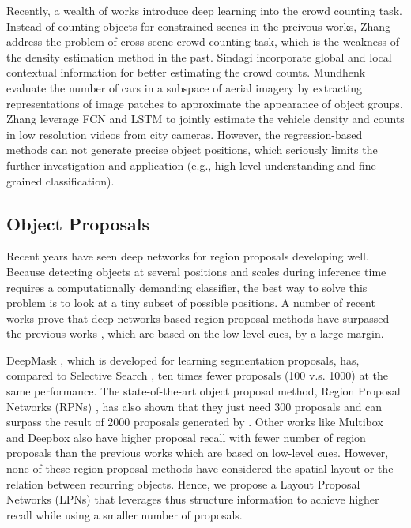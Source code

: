 \documentclass[10pt,twocolumn,letterpaper]{article}
\begin{document}
Recently, a wealth of works introduce deep learning into the crowd counting task. Instead of counting objects for constrained scenes in the preivous works, Zhang \etal \cite{53_zhang2015cross} address the problem of cross-scene crowd counting task, which is the weakness of the density estimation method in the past. Sindagi \etal \cite{55_sindagi2017generating} incorporate global and local contextual information for better estimating the crowd counts. Mundhenk \etal \cite{04_mundhenk2016large} evaluate the number of cars in a subspace of aerial imagery by extracting representations of image patches to approximate the appearance of object groups. 
Zhang \etal \cite{57_zhang2017fcn} leverage FCN and LSTM to jointly estimate the vehicle density and counts in low resolution videos from city cameras. However, the regression-based methods can not generate precise object positions, which seriously limits the further investigation and application (e.g., high-level understanding and fine-grained classification).

\subsection{Object Proposals}

Recent years have seen deep networks for region proposals developing well. Because detecting objects at several positions and scales during inference time requires a computationally demanding classifier, the best way to solve this problem is to look at a tiny subset of possible positions. A number of recent works prove that deep networks-based region proposal methods have surpassed the previous works \cite{17_uijlings2013selective, 28_arbelaez2014multiscale, 29_zitnick2014edge, 30_cheng2014bing}, which are based on the low-level cues, by a large margin.

DeepMask \cite{32_pinheiro2015learning}, which is developed for learning segmentation proposals, has, compared to Selective Search \cite{17_uijlings2013selective}, ten times fewer proposals (100 v.s. 1000) at the same performance. The state-of-the-art object proposal method, Region Proposal Networks (RPNs) \cite{21_ren2015faster}, has also shown that they just need 300 proposals and can surpass the result of 2000 proposals generated by \cite{17_uijlings2013selective}. Other works like Multibox \cite{25_szegedy2014scalable} and Deepbox \cite{29_zitnick2014edge} also have higher proposal recall with fewer number of region proposals than the previous works which are based on low-level cues. However, none of these region proposal methods have considered the spatial layout or the relation between recurring objects. Hence, we propose a Layout Proposal Networks (LPNs) that leverages thus structure information to achieve higher recall while using a smaller number of proposals.
\end{document}
